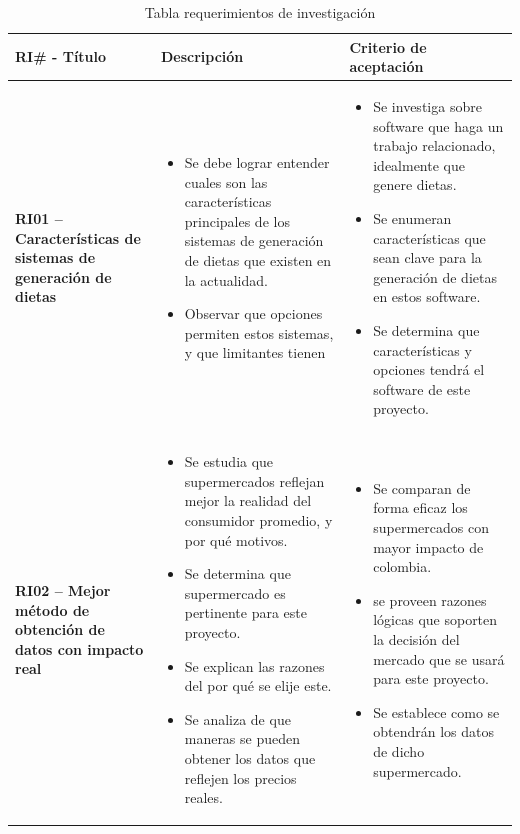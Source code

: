 \begin{longtable}[c]{| p{}  | p{}  | p{}  |}
    \caption{Tabla requerimientos de investigaci\'on}
    \label{tab:Tabla requerimientos de investigacion}
         \\ \hline \textbf{RI\# - T\'itulo} & \textbf{Descripci\'on} & \textbf{Criterio de aceptaci\'on}  \\ \hline
         \textbf{RI01 -- Caracter\'isticas de sistemas de generaci\'on de dietas} & \begin{itemize}
             \item Se debe lograr entender cuales son las caracter\'isticas principales de los sistemas de generaci\'on de dietas que existen en la actualidad.
             \item Observar que opciones permiten estos sistemas, y que limitantes tienen
         \end{itemize} & \begin{itemize}
             \item Se investiga sobre software que haga un trabajo relacionado, idealmente que genere dietas.
             \item Se enumeran caracter\'isticas que sean clave para la generaci\'on de dietas en estos software.
             \item Se determina que caracter\'isticas y opciones tendr\'a el software de este proyecto.
         \end{itemize} \\\hline
         
         \textbf{RI02 -- Mejor m\'etodo de obtenci\'on de datos con impacto real} & \begin{itemize}
             \item Se estudia que supermercados reflejan mejor la realidad del consumidor promedio, y por qu\'e motivos.
             \item Se determina que supermercado es pertinente para este proyecto.
             \item Se explican las razones del por qu\'e se elije este.
             \item Se analiza de que maneras se pueden obtener los datos que reflejen  los precios reales.
         \end{itemize}& \begin{itemize}
             \item Se comparan de forma eficaz los supermercados con mayor impacto de colombia.
             \item se proveen razones l\'ogicas que soporten la decisi\'on del mercado que se usar\'a para este proyecto.
             \item Se establece como se obtendr\'an los datos de dicho supermercado.
         \end{itemize} \\  \hline
        
\end{longtable}


